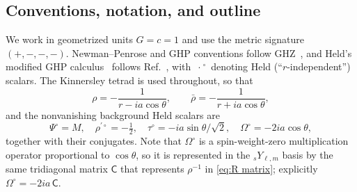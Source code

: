 \documentclass[preprint,aps,nofootinbib,a4paper,superscriptaddress,longbibliography,amsfonts, amssymb,amsmath,titlepage]{revtex4-1}
\numberwithin{equation}{section} %
\newcommand{\Held}[1]{{#1}^{\circ}}
\def\tauH{\tau^{\circ}}
\def\PsiH{\Psi^{\circ}}
\def\rhopH{\rho^{\prime \circ}}
\def\Oh{{\Omega}^\circ}
\newcommand{\emm}{m}
\def\l{\ensuremath{\ell}}
\newcommand{\sYY}[3]{{}_{#1}Y_{#2,#3}}
\begin{document}
\subsection{Conventions, notation, and outline}\label{sec:conventions}
We work in geometrized units $G=c=1$ and use the metric signature
$(+,-,-,-)$.  Newman--Penrose and GHP conventions follow
GHZ~\cite{Green:2019nam}, and Held's modified GHP
calculus~\cite{Held:1974,Held:1975} follows
Ref.~\cite{Hollands:2024iqp}, with
$\Held{\ \cdot\ }$ denoting Held (``$r$-independent'') scalars.
The Kinnersley tetrad is used throughout, so that
\begin{equation}\label{eq:rho def}
\rho = -\frac{1}{r-ia\cos\theta},
\qquad
\bar\rho = -\frac{1}{r+ia\cos\theta},
\end{equation}
and the nonvanishing background Held scalars are
\begin{equation}\label{eq:bkgd held}
\PsiH = M,\quad
\rhopH = -\tfrac12,\quad
\tauH = - ia\sin\theta/\sqrt2,\quad
\Oh = -2ia\cos\theta ,
\end{equation}
together with their conjugates.  Note that $\Oh$ is a spin-weight-zero multiplication operator
proportional to $\cos\theta$, so it is represented in the
$\sYY{s}{\l}{\emm}$ basis by the same tridiagonal matrix $\mathsf C$ that
represents $\rho^{-1}$ in \eqref{eq:R matrix}; explicitly
$\Oh = -2ia\,\mathsf C$.
\end{document}
